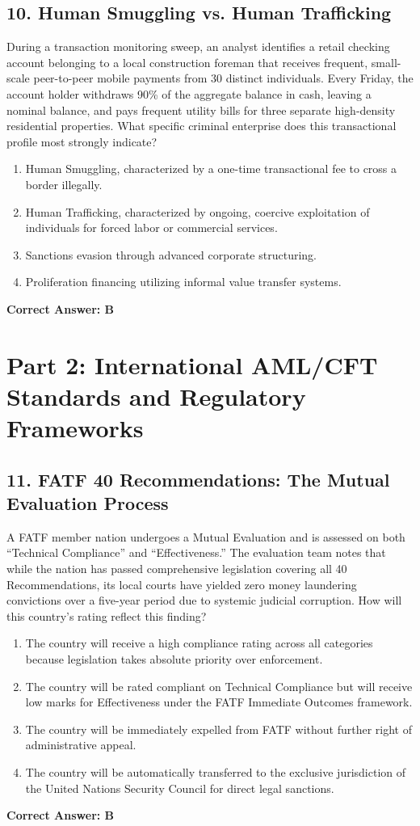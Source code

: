 \documentclass[11pt,a4paper]{article}
\begin{document}
	\subsection{10. Human Smuggling vs. Human Trafficking}
	During a transaction monitoring sweep, an analyst identifies a retail checking account belonging to a local construction foreman that receives frequent, small-scale peer-to-peer mobile payments from 30 distinct individuals. Every Friday, the account holder withdraws 90\% of the aggregate balance in cash, leaving a nominal balance, and pays frequent utility bills for three separate high-density residential properties. What specific criminal enterprise does this transactional profile most strongly indicate?
	\begin{enumerate}[label=\Alph*.]
		\item Human Smuggling, characterized by a one-time transactional fee to cross a border illegally.
		\item Human Trafficking, characterized by ongoing, coercive exploitation of individuals for forced labor or commercial services.
		\item Sanctions evasion through advanced corporate structuring.
		\item Proliferation financing utilizing informal value transfer systems.
	\end{enumerate}
	\textbf{Correct Answer: B}
	
	\newpage
	\section{Part 2: International AML/CFT Standards and Regulatory Frameworks}
	
	\subsection{11. FATF 40 Recommendations: The Mutual Evaluation Process}
	A FATF member nation undergoes a Mutual Evaluation and is assessed on both ``Technical Compliance'' and ``Effectiveness.'' The evaluation team notes that while the nation has passed comprehensive legislation covering all 40 Recommendations, its local courts have yielded zero money laundering convictions over a five-year period due to systemic judicial corruption. How will this country's rating reflect this finding?
	\begin{enumerate}[label=\Alph*.]
		\item The country will receive a high compliance rating across all categories because legislation takes absolute priority over enforcement.
		\item The country will be rated compliant on Technical Compliance but will receive low marks for Effectiveness under the FATF Immediate Outcomes framework.
		\item The country will be immediately expelled from FATF without further right of administrative appeal.
		\item The country will be automatically transferred to the exclusive jurisdiction of the United Nations Security Council for direct legal sanctions.
	\end{enumerate}
	\textbf{Correct Answer: B}
	
\end{document}
